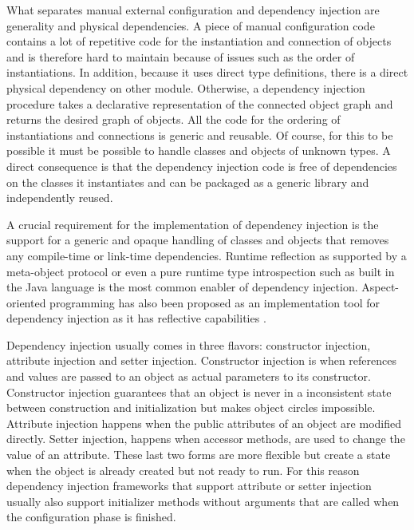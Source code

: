 What separates manual external configuration and dependency injection are generality and physical dependencies.
A piece of manual configuration code contains a lot of repetitive code for the instantiation and connection
of objects and is therefore hard to maintain because of issues such as the order of instantiations. In addition,
because it uses direct type definitions, there is a direct physical dependency on other module. Otherwise,
a dependency injection procedure takes a declarative representation of the connected object graph
and returns the desired graph of objects. All the code for the ordering of instantiations and connections
is generic and reusable. Of course, for this to be possible it must be possible to handle classes and objects
of unknown types. A direct consequence is that the dependency injection code is free of dependencies on
the classes it instantiates and can be packaged as a generic library and independently reused.

A crucial requirement for the implementation of dependency injection is the support for a generic and opaque
handling of classes and objects that removes any compile-time or link-time dependencies. Runtime reflection
as supported by a meta-object protocol \cite{Kiczales} or even a pure runtime type introspection such
as built in the Java language is the most common enabler of dependency injection. Aspect-oriented programming
has also been proposed as an implementation tool for dependency injection as it has reflective capabilities
\cite{Chiba2005}.

Dependency injection usually comes in three flavors: constructor injection, attribute injection and setter injection.
Constructor injection is when references and values are passed to an object as actual parameters to its constructor.
Constructor injection guarantees that an object is never in a inconsistent state between construction and initialization
but makes object circles impossible. Attribute injection happens when the public attributes of an object are modified
directly. Setter injection, happens when accessor methods, are used to change the value of an attribute. These last
two forms are more flexible but create a state when the object is already created but not ready to run. For this reason
dependency injection frameworks that support attribute or setter injection usually also support initializer methods
without arguments that are called when the configuration phase is finished.

